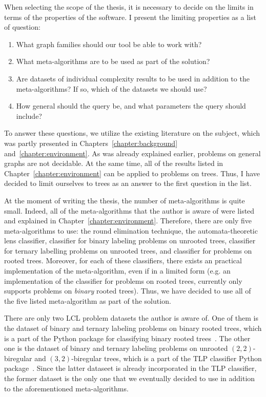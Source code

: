 When selecting the scope of the thesis, it is necessary
to decide on the limits
in terms of the properties of the software. I present the limiting properties
as a list of question:

\begin{enumerate}
  \item What graph families should our tool be able to work with?
  \item What meta-algorithms are to be used as part of the solution?
  \item Are datasets of individual complexity results to be used
  in addition to the meta-algorithms? If so, which of the datasets we should use?
  \item How general should the query be, and what parameters the query should include?
\end{enumerate}

To answer these questions, we utilize the existing literature on the subject, which was partly presented in Chapters~\ref{chapter:background} and~\ref{chapter:environment}. As was already explained earlier, problems on general graphs are not decidable. At the same time, all of the results listed in Chapter~\ref{chapter:environment} can be applied to problems on trees. Thus,
I have decided to limit ourselves to trees as an answer to the first question in the list.

At the moment of writing the thesis, the number of meta-algorithms is
quite small. Indeed, all of the meta-algorithms that the author is aware of were listed and explained in Chapter~\ref{chapter:environment}. Therefore, there are only five meta-algorithms to use: the round elimination technique, the automata-theoretic lens classifier, classifier for binary labeling problems on unrooted trees, classifier for ternary labelling problems on unrooted trees, and classifier for problems on rooted trees. Moreover, for each of these classifiers, there exists an practical implementation of the meta-algorithm, even if in a limited form (e.g. an implementation of the classifier for problems on rooted trees, currently only supports problems on \emph{binary} rooted trees). Thus, we have decided to use all of the five listed meta-algorithm as part of the solution.

There are only two LCL problem datasets the author is aware of. One of them is the dataset of binary and ternary labeling problems on binary rooted trees, which is a
part of the Python package for classifying binary rooted trees~\cite{Tereshchenko2020brt}. The other one is the dataset of binary and ternary labeling problems on
unrooted $(2, 2)$-biregular and $(3, 2)$-biregular trees, which is a part of the TLP classifier Python package~\cite{Rocher2020clas}. Since the latter dataseet is already incorporated in the TLP classifier,
the former dataset is the only one that we eventually decided to use
in addition to the aforementioned meta-algorithms.

